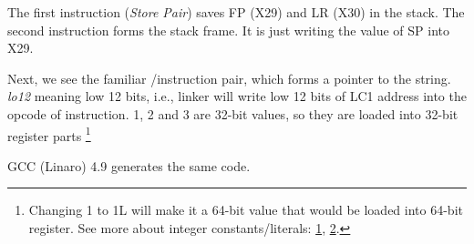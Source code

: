 



The first instruction  (\emph{Store Pair}) saves \ac{FP} (X29) and \ac{LR} (X30) in the stack.
The second  instruction forms the stack frame.
It is just writing the value of \ac{SP} into X29.

Next, we see the familiar /\ADD instruction pair, which forms a pointer to the string.
\emph{lo12} meaning low 12 bits, i.e., linker will write low 12 bits of LC1 address into the opcode of \ADD instruction.
1, 2 and 3 are 32-bit \Tint{} values, so they are loaded into 32-bit register parts
\footnote{Changing 1 to 1L will make it a 64-bit value that would be loaded into 64-bit register.
See more about integer constants/literals:
\href{https://en.cppreference.com/w/c/language/integer_constant}{1},
\href{https://en.cppreference.com/w/cpp/language/integer_literal}{2}.}

\Optimizing GCC (Linaro) 4.9 generates the same code.

